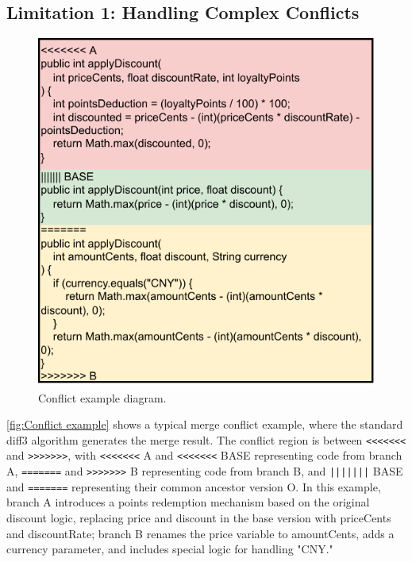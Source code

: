 \documentclass[sigconf,review,anonymous]{acmart}
\begin{document}
\subsection{Limitation 1: Handling Complex Conflicts}
\begin{figure}[b]
    \centering
    \includegraphics[width=1\linewidth]{Figures/Conflict example diagram.pdf}
    \caption{Conflict example diagram.}
    \label{fig:Conflict example}
\end{figure}

\autoref{fig:Conflict example} shows a typical merge conflict example, where the standard diff3 algorithm generates the merge result.
The conflict region is between \verb|<<<<<<<| and \verb|>>>>>>>|, with \verb|<<<<<<<| A and \verb|<<<<<<<| BASE representing code from branch A, \verb|=======| and \verb|>>>>>>>| B representing code from branch B, and \verb+|||||||+ BASE and \verb|=======| representing their common ancestor version O. In this example, branch A introduces a points redemption mechanism based on the original discount logic, replacing price and discount in the base version with priceCents and discountRate; branch B renames the price variable to amountCents, adds a currency parameter, and includes special logic for handling "CNY."
\end{document}
